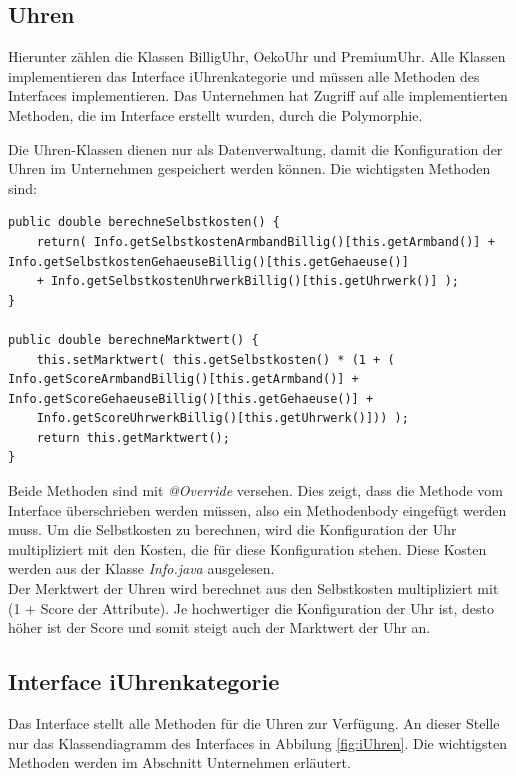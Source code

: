 \subsection{Uhren}
Hierunter zählen die Klassen BilligUhr, OekoUhr und PremiumUhr. Alle Klassen implementieren das Interface iUhrenkategorie und müssen alle Methoden des Interfaces implementieren. Das Unternehmen hat Zugriff auf alle implementierten Methoden, die im Interface erstellt wurden, durch die Polymorphie. 

Die Uhren-Klassen dienen nur als Datenverwaltung, damit die Konfiguration der Uhren im Unternehmen gespeichert werden können. Die wichtigsten Methoden sind: \\
\lstset{language=Java}
\begin{lstlisting}
public double berechneSelbstkosten() {
	return( Info.getSelbstkostenArmbandBillig()[this.getArmband()] + Info.getSelbstkostenGehaeuseBillig()[this.getGehaeuse()] 
	+ Info.getSelbstkostenUhrwerkBillig()[this.getUhrwerk()] );
}

public double berechneMarktwert() {
	this.setMarktwert( this.getSelbstkosten() * (1 + ( Info.getScoreArmbandBillig()[this.getArmband()] + Info.getScoreGehaeuseBillig()[this.getGehaeuse()] + 
	Info.getScoreUhrwerkBillig()[this.getUhrwerk()])) ); 
	return this.getMarktwert();
}
\end{lstlisting}
Beide Methoden sind mit \textit{@Override} versehen. Dies zeigt, dass die Methode vom Interface überschrieben werden müssen, also ein Methodenbody eingefügt werden muss. Um die Selbstkosten zu berechnen, wird die Konfiguration der Uhr multipliziert mit den Kosten, die für diese Konfiguration stehen. Diese Kosten werden aus der Klasse \textit{Info.java} ausgelesen.\\

Der Merktwert der Uhren wird berechnet aus den Selbstkosten multipliziert mit (1 + Score der Attribute). Je hochwertiger die Konfiguration der Uhr ist, desto höher ist der Score und somit steigt auch der Marktwert der Uhr an.

\subsection{Interface iUhrenkategorie}
Das Interface stellt alle Methoden für die Uhren zur Verfügung. An dieser Stelle nur das Klassendiagramm des Interfaces in Abbilung \ref{fig:iUhren}. Die wichtigsten Methoden werden im Abschnitt Unternehmen erläutert.

